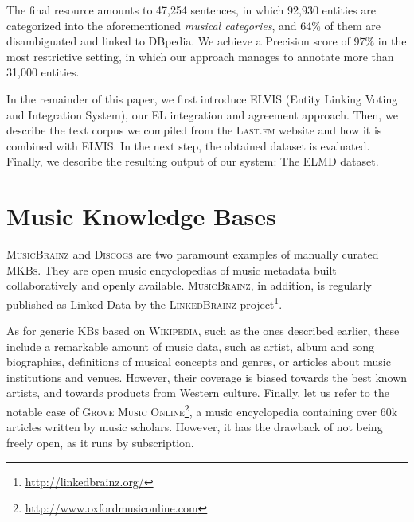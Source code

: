 
The final resource amounts to 47,254 sentences, in which 92,930 entities are categorized into the aforementioned \textit{musical categories}, and 64\% of them are disambiguated and linked to DBpedia. We achieve a Precision score of 97\% in the most restrictive setting, in which our approach manages to annotate more than 31,000 entities.

In the remainder of this paper, we first introduce \textsc{ELVIS} (Entity Linking Voting and Integration System), our EL integration and agreement approach. Then, we describe the text corpus we compiled from the \textsc{Last.fm} website and how it is combined with ELVIS. In the next step, the obtained dataset is evaluated. Finally, we describe the resulting output of our system: The \textsc{ELMD} dataset. 


\section{Music Knowledge Bases}\label{sec:related_work:mus_rec}

\textsc{MusicBrainz} and \textsc{Discogs} are two paramount examples of manually curated \textsc{MKBs}. They are open music encyclopedias of music metadata built collaboratively and openly available. \textsc{MusicBrainz}, in addition, is regularly published as Linked Data by the \textsc{LinkedBrainz} project\footnote{\url{http://linkedbrainz.org/}}.

As for generic \textsc{KBs} based on \textsc{Wikipedia}, such as the ones described earlier, these include a remarkable amount of music data, such as artist, album and song biographies, definitions of musical concepts and genres, or articles about music institutions and venues. However, their coverage is biased towards the best known artists, and towards products from Western culture. Finally, let us refer to the notable case of \textsc{Grove Music Online}\footnote{\url{http://www.oxfordmusiconline.com}}, a music encyclopedia containing over 60k articles written by music scholars. However, it has the drawback of not being freely open, as it runs by subscription.

